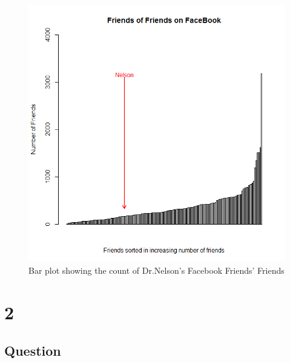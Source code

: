 \documentclass[letterpaper,11pt]{article}
\begin{document}
\clearpage
\begin{figure}[h]
\includegraphics[scale=0.5]{qn1/Rgraphfinal.png}
\caption{Bar plot showing the count of Dr.Nelson's Facebook Friends' Friends}
\label{fig:q1barplot}
\end{figure}

\newpage


\newpage



\newpage
\section*{2}

\subsection*{Question}
\end{document}
